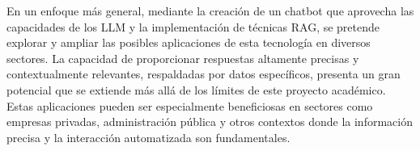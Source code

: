 En un enfoque más general, mediante la creación de un chatbot que aprovecha las capacidades de los LLM y la implementación de técnicas RAG, se pretende explorar y ampliar las posibles aplicaciones de esta tecnología en diversos sectores. La capacidad de proporcionar respuestas altamente precisas y contextualmente relevantes, respaldadas por datos específicos, presenta un gran potencial que se extiende más allá de los límites de este proyecto académico. Estas aplicaciones pueden ser especialmente beneficiosas en sectores como empresas privadas, administración pública y otros contextos donde la información precisa y la interacción automatizada son fundamentales.






